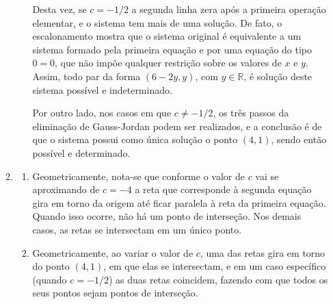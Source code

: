 \documentclass[12pt,a4paper]{article}
\newcommand*\R{\mathbb{R}}
\begin{document}
\begin{enumerate}
\begin{enumerate}
\begin{enumerate}
Desta vez, se $c = -1/2$ a segunda linha zera após a primeira operação elementar, e o sistema tem mais de uma solução. De fato, o escalonamento mostra que o sistema original é equivalente a um sistema formado pela primeira equação e por uma equação do tipo $0=0$, que não impõe qualquer restrição sobre os valores de $x$ e $y$. Assim, todo par da forma $(6-2y, y)$, com $y \in \R$, é solução deste sistema possível e indeterminado.

Por outro lado, nos casos em que $c \neq -1/2$, os três passos da eliminação de Gauss-Jordan podem ser realizados, e a conclusão é de que o sistema possui como única solução o ponto $(4,1)$, sendo então possível e determinado.
\end{enumerate}

\item \begin{enumerate}
\item Geometricamente, nota-se que conforme o valor de $c$ vai se aproximando de $c=-4$ a reta que corresponde à segunda equação gira em torno da origem até ficar paralela à reta da primeira equação. Quando isso ocorre, não há um ponto de interseção. Nos demais casos, as retas se intersectam em um único ponto.
\item Geometricamente, ao variar o valor de $c$, uma das retas gira em torno do ponto $(4,1)$, em que elas se intersectam, e em um caso específico (quando $c=-1/2$) as duas retas coincidem, fazendo com que todos os seus pontos sejam pontos de interseção.
\end{enumerate}
\end{enumerate}


\end{enumerate}
\end{document}
